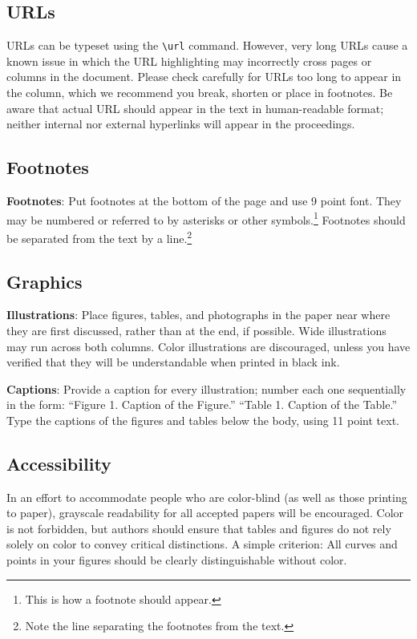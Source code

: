 \documentclass[11pt,a4paper]{article}
\begin{document}
\subsection{URLs}

URLs can be typeset using the \verb|\url| command. However, very long
URLs cause a known issue in which the URL highlighting may incorrectly
cross pages or columns in the document. Please check carefully for
URLs too long to appear in the column, which we recommend you break,
shorten or place in footnotes. Be aware that actual URL should appear
in the text in human-readable format; neither internal nor external
hyperlinks will appear in the proceedings.

\subsection{Footnotes}

{\bf Footnotes}: Put footnotes at the bottom of the page and use 9
point font. They may be numbered or referred to by asterisks or other
symbols.\footnote{This is how a footnote should appear.} Footnotes
should be separated from the text by a line.\footnote{Note the line
separating the footnotes from the text.}

\subsection{Graphics}

{\bf Illustrations}: Place figures, tables, and photographs in the
paper near where they are first discussed, rather than at the end, if
possible.  Wide illustrations may run across both columns.  Color
illustrations are discouraged, unless you have verified that  
they will be understandable when printed in black ink.

{\bf Captions}: Provide a caption for every illustration; number each one
sequentially in the form:  ``Figure 1. Caption of the Figure.'' ``Table 1.
Caption of the Table.''  Type the captions of the figures and 
tables below the body, using 11 point text.


\subsection{Accessibility}
\label{ssec:accessibility}

In an effort to accommodate people who are color-blind (as well as those printing
to paper), grayscale readability for all accepted papers will be
encouraged.  Color is not forbidden, but authors should ensure that
tables and figures do not rely solely on color to convey critical
distinctions. A simple criterion: All curves and points in your figures should be clearly distinguishable without color.
\end{document}
